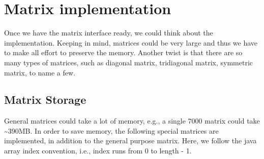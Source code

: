 \chapter{Matrix implementation}
\minitoc
Once we have the matrix interface ready, we could think about the implementation. Keeping in mind, matrices could be very large and thus we have to make all effort to preserve the memory. Another twist is that there are so many types of matrices, such as diagonal matrix, tridiagonal matrix, symmetric matrix, to name a few. 


\section{Matrix Storage}
General matrices could take a lot of memory, e.g., a single 7000  matrix could take \textasciitilde 390MB. In order to save memory, the following special matrices are implemented, in addition to the general purpose matrix. Here, we follow the java array index convention, i.e., index runs from 0 to length - 1.
